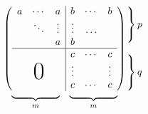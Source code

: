 \documentclass{ctexart}
\begin{document}
	\[
	\begin{array}{c@{\hspace{-5pt}}l} %
		\left(
			\begin{array}{ccc|ccc}
				a							& \cdots	& a			& b			& \cdots	& b			\\
											& \ddots	& \vdots	& \vdots	& \dots					\\
											&			& a			& b									\\
				\hline
											&			&			& c			& \cdots	& c			\\
											&			&			& \vdots	&			& \vdots	\\
				\multicolumn{3}{c|}{\raisebox{2ex}[0pt]{\Huge 0}}	& c			& \cdots	& c
			\end{array}
		\right)
		&
		\begin{array}{l}
			\left.\rule{0mm}{7mm}\right\}p	\\
			\\
			\left.\rule{0mm}{7mm}\right\}q	\\
		\end{array}
		\\[-5pt]
		\begin{array}{cc}
			\underbrace{\rule{17mm}{0mm}}_m	& \underbrace{\rule{17mm}{0mm}}_m
		\end{array}
		& %
	\end{array}
	\]
	
\end{document}
